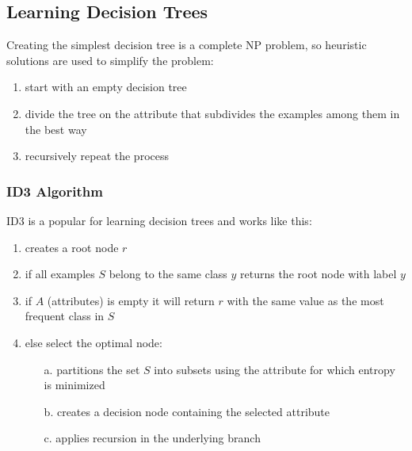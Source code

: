\subsection{Learning Decision Trees}
Creating the simplest decision tree is a complete NP problem, so heuristic solutions are used to simplify the problem:
\begin{enumerate}
    \item start with an empty decision tree
    \item divide the tree on the attribute that subdivides the examples among them in the best way
    \item recursively repeat the process
\end{enumerate}

\subsubsection{ID3 Algorithm}
ID3 is a popular for learning decision trees and works like this:
\begin{enumerate}
    \item creates a root node $r$
    \item if all examples $S$ belong to the same class $y$ returns the root node with label $y$
    \item if $A$ (attributes) is empty it will return $r$ with the same value as the most frequent class in $S$
    \item else select the optimal node:
    \begin{enumerate}
        \item[a.] partitions the set $S$ into subsets using the attribute for which entropy is minimized
        \item[b.] creates a decision node containing the selected attribute
        \item[c.] applies recursion in the underlying branch
    \end{enumerate}
\end{enumerate}

\newpage